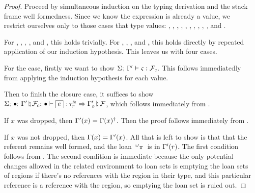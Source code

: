 \begin{proof}
  Proceed by simultaneous induction on the typing derivation and the stack frame
  well formedness.
  Since we know the expression is already a value, we restrict ourselves
  only to those cases that type values: , ,
  , , , ,
  , , , , and
  .

  For , , , , and
  , this holds trivially. For ,
  , , and , this holds directly
  by repeated application of our induction hypothesis. This leaves us with
  four cases.

  \vspace{1em}
  \noindent \framebox[\textwidth]{ \figuresize
    \begin{mathpar}
      \TClosureVal
    \end{mathpar}
  } \vspace{1em}

  For the  case, firstly we want to show
  $\Sigma; \: \Gamma^\prime \vdash \varsigma : \mathcal{F}_c$.
  This follows immediatedly from applying the induction hypothesis for each value.

  Then to finish the closure case, it suffices to show\\
  $\oxtypjudge{\oxglobalctx}{\oxemptyctx}{\oxemptyctx}{\oxnewframe{\oxvarctx^\prime}{\oxframe_c}}
  {\oxexpr}{\oxsitype_r}{\oxnewframe{\oxvarctx_o^\prime}{\oxframe}}$, which
  follows immediately from .
  

  \vspace{1em}
  \noindent \framebox[\textwidth]{ \figuresize
    \begin{mathpar}
      \TPointer
    \end{mathpar}
  } \vspace{1em}
  
  If $x$ was dropped, then $\Gamma^\prime(x) = \Gamma(x)^\dagger$. Then
  the proof follows immediately from .
  
  If $x$ was not dropped, then $\Gamma(x) = \Gamma^\prime(x)$. All that
  is left to show is that that the referent remains well formed, and the loan
  $\,^{\omega}\pi\,$ is in $\Gamma^\prime(r)$. The
  first condition follows from . The second
  condition is immediate because the only potential changes allowed in the
  related environment to loan sets is emptying the loan sets of regions if
  there's no references with the region in their type, and this particular
  reference is a reference with the region, so emptying the loan set is ruled
  out.
\end{proof}
  
